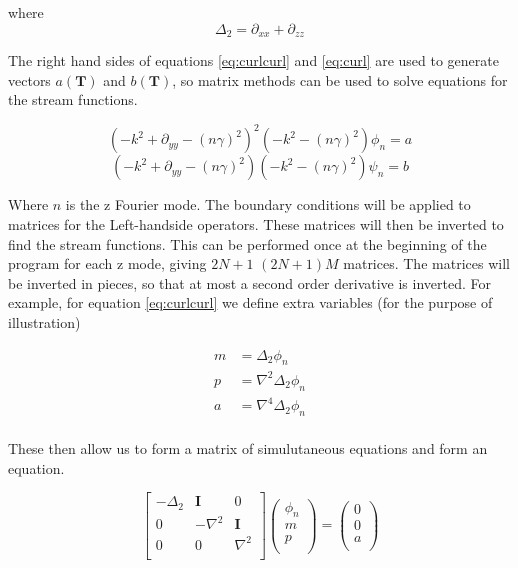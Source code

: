 \documentclass[12pt,a4paper]{article}
\newcommand{\dd}[1]{\partial_{#1}}
\begin{document}
where
\begin{equation}
    \Delta_{2} = \dd{xx} + \dd{zz}
\end{equation}

The right hand sides of equations \ref{eq:curlcurl} and \ref{eq:curl} are used to generate vectors $a(\mathbf{T})$ and  $b(\mathbf{T})$, so matrix methods can be used to solve equations for the stream functions.

\begin{equation}
    \left( -k^{2} + \dd{yy} -(n\gamma)^{2} \right)^{2}(-k^{2} -(n\gamma)^{2})\phi_{n} = a
\end{equation}
\begin{equation}
    \left( -k^{2} + \dd{yy} -(n\gamma)^{2} \right)(-k^{2} -(n\gamma)^{2})\psi_{n} = b
\end{equation}

Where $n$ is the z Fourier mode. The boundary conditions will be applied to matrices for the Left-handside operators. These matrices will then be inverted to find the stream functions. This can be performed once at the beginning of the program for each z mode, giving $2N+1$ $(2N+1)M$ matrices. The matrices will be inverted in pieces, so that at most a second order derivative is inverted. For example, for equation \ref{eq:curlcurl} we define extra variables (for the purpose of illustration)

\begin{eqnarray}
    m &= \Delta_{2} \phi_{n} \\
    p &= \nabla^{2}\Delta_{2} \phi_{n} \\
    a &= \nabla^{4}\Delta_{2} \phi_{n} \\
\end{eqnarray}

These then allow us to form a matrix of simulutaneous equations and form an equation.

\begin{equation}
    \begin{bmatrix}
    -\Delta_{2} & \mathbf{I}	& 0 \\
    0	        & - \nabla^{2}	& \mathbf{I} \\
    0		& 0		& \nabla^{2} \\
    \end{bmatrix}
    \begin{pmatrix}
    \phi_{n} \\
    m \\
    p \\
    \end{pmatrix}
    = 
    \begin{pmatrix}
    0 \\
    0\\
    a\\
    \end{pmatrix}
\end{equation}
\end{document}
